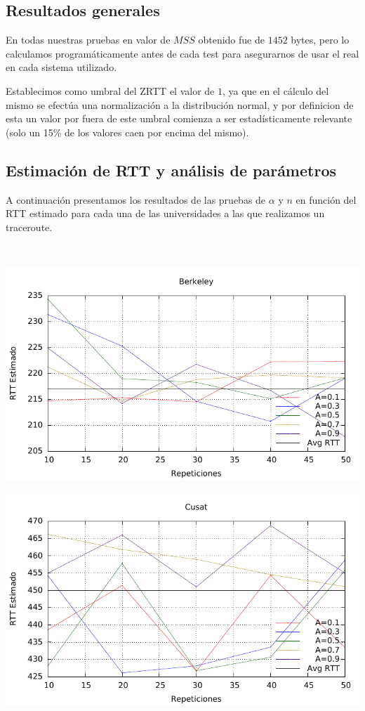 \subsection{Resultados generales}
 En todas nuestras pruebas en valor de $MSS$ obtenido fue de $1452$ bytes, pero lo calculamos programáticamente antes de cada test para asegurarnos de usar el real en cada sistema utilizado.
 
 Establecimos como umbral del ZRTT el valor de $1$, ya que en el cálculo del mismo se efectúa una normalización a la distribución normal, y por definicion de esta un valor por fuera de este umbral comienza a ser estadísticamente relevante (solo un 15\% de los valores caen por encima del mismo).
 
\subsection{Estimación de RTT y análisis de parámetros}

A continuación presentamos los resultados de las pruebas de $\alpha$ y $n$ en función del RTT estimado para cada una de las universidades a las que realizamos un traceroute.

~

\begin{minipage}{0.48\textwidth}
    \includegraphics[scale=0.62]{imgs/thoughput/berkeley_rtt.pdf}
\end{minipage}
\begin{minipage}{0.48\textwidth}
    \includegraphics[scale=0.62]{imgs/thoughput/cusat_rtt.pdf}
\end{minipage}

